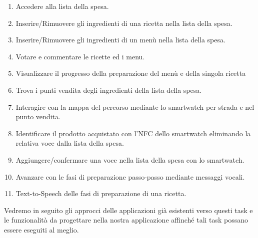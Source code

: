 \begin{enumerate}
\item Accedere alla lista della spesa.
\item Inserire/Rimuovere gli ingredienti di una ricetta nella lista della spesa.
\item Inserire/Rimuovere gli ingredienti di un menù nella lista della spesa.

\item Votare e commentare le ricette ed i menu.

\item Visualizzare il progresso della preparazione del menù e della singola ricetta



\item Trova i punti vendita degli ingredienti della lista della spesa.
\item Interagire con la mappa del percorso mediante lo smartwatch per strada e nel punto vendita.
\item Identificare il prodotto acquistato con l'NFC dello smartwatch eliminando la relativa voce dalla lista della spesa.
\item Aggiungere/confermare una voce nella lista della spesa con lo smartwatch.


\item Avanzare con le fasi di preparazione passo-passo mediante messaggi vocali.
\item Text-to-Speech delle fasi di preparazione di una ricetta.


\end{enumerate}

Vedremo in seguito gli approcci delle applicazioni già esistenti verso
questi task e le funzionalità da progettare nella nostra applicazione
affinché tali task possano essere eseguiti al meglio.


